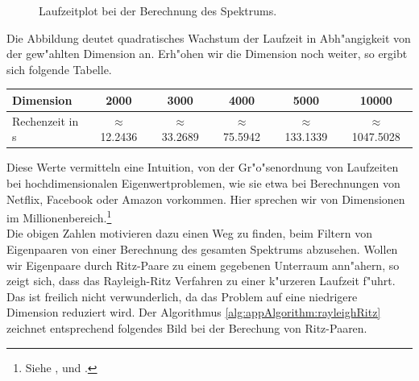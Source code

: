 \begin{figure}[h!]
\centering


\caption{Laufzeitplot bei der Berechnung des Spektrums.}\label{fig:chap5:laufzeit}
\end{figure}

Die Abbildung deutet quadratisches Wachstum der Laufzeit in Abh"angigkeit von der gew"ahlten Dimension an.
 Erh"ohen wir die Dimension noch weiter, so ergibt sich folgende Tabelle.

\begin{center}
\begin{tabular}{lccccc}
Dimension & 2000 & 3000 & 4000 & 5000 & 10000 \\
\hline
Rechenzeit in s & $\approx$ 12.2436 & $\approx$ 33.2689 & $\approx$ 75.5942 & $\approx$ 133.1339 & $\approx$ 1047.5028
\end{tabular}
\end{center}

Diese Werte vermitteln eine Intuition, von der Gr"o"senordnung von Laufzeiten bei hochdimensionalen Eigenwertproblemen, wie sie etwa bei Berechnungen von Netflix, Facebook oder Amazon vorkommen. Hier sprechen wir von Dimensionen im Millionenbereich.\footnote{Siehe \cite{facebook}, \cite{amazon} und \cite{netflix}.}\\

Die obigen Zahlen motivieren dazu einen Weg zu finden, beim Filtern von Eigenpaaren von einer Berechnung des gesamten Spektrums abzusehen. Wollen wir Eigenpaare durch Ritz-Paare zu einem gegebenen Unterraum ann"ahern, so zeigt sich, dass das Rayleigh-Ritz Verfahren zu einer k"urzeren Laufzeit f"uhrt. Das ist freilich nicht verwunderlich, da das Problem auf eine niedrigere Dimension reduziert wird. Der Algorithmus \ref{alg:appAlgorithm:rayleighRitz} zeichnet entsprechend folgendes Bild bei der Berechung von Ritz-Paaren.

